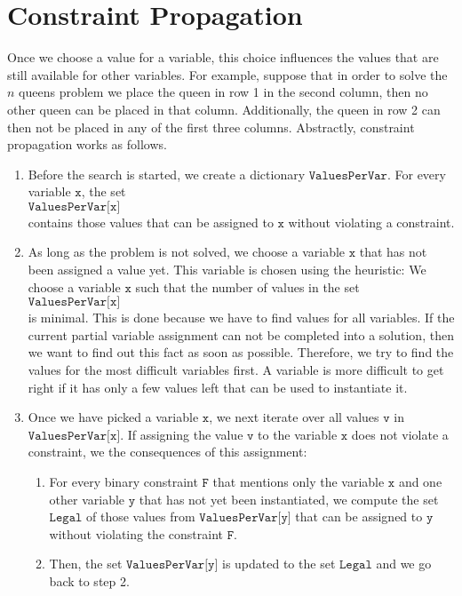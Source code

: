 \section{Constraint Propagation}
Once we choose a value for a variable, this choice influences the values that are still available for other variables.
For example, suppose that in order to solve the $n$ queens problem we place the queen in row 1 in the second
column, then no other queen can be placed in 
that column.   Additionally, the queen in row 2 can then not be placed in any of the first three columns.
Abstractly, constraint propagation works as follows.
\begin{enumerate}
\item Before the search is started, we create a dictionary $\texttt{ValuesPerVar}$.  For every variable
      $\texttt{x}$,  the set
      \\[0.2cm]
      \hspace*{1.3cm}
      $\texttt{ValuesPerVar[x]}$ 
      \\[0.2cm]
      contains those values that can be assigned to
      $\texttt{x}$ without violating a constraint. 
\item As long as the problem is not solved,  we choose a variable $\texttt{x}$ that has not been assigned a
      value yet.  This variable is chosen using the  heuristic:  We choose a
      variable $\texttt{x}$ such that the number of values in the set
      \\[0.2cm]
      \hspace*{1.3cm}
      $\texttt{ValuesPerVar[x]}$ 
      \\[0.2cm]
      is minimal.  This is done because we have to
      find values for all variables.  If the current partial variable assignment can not be completed into a
      solution, then we want to find out this fact as soon as possible.  Therefore, we try to find the values
      for the most difficult variables first.  A variable is more difficult to get right if it has only a few
      values left that can be used to instantiate it.
\item Once we have picked a variable $\texttt{x}$, we next iterate over all values $\texttt{v}$ in
      $\texttt{ValuesPerVar[x]}$.  If assigning the value $\texttt{v}$ to the variable $\texttt{x}$ does not
      violate a constraint, we  the consequences of this assignment:
      \begin{enumerate}
      \item For every binary constraint $\texttt{F}$ that mentions only the variable $\texttt{x}$ and one other variable
            $\texttt{y}$ that has not yet been instantiated, we compute the set $\texttt{Legal}$ of those values from 
            $\texttt{ValuesPerVar[y]}$ that can be assigned to $\texttt{y}$ without violating the constraint
            $\texttt{F}$.
            
      \item Then, the set $\texttt{ValuesPerVar[y]}$ is updated to the set $\texttt{Legal}$ and we go back to
            step 2.
      \end{enumerate}
\end{enumerate}
